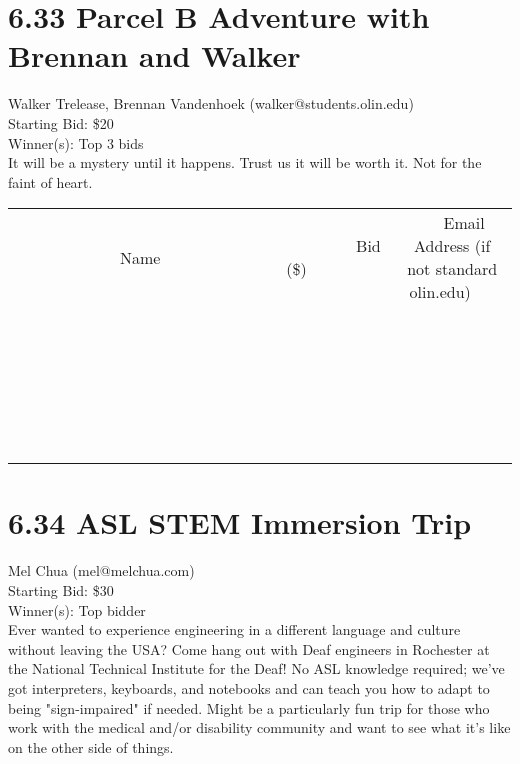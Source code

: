 \documentclass[11pt]{article}
\begin{document}
\section*{6.33 Parcel B Adventure with Brennan and Walker}
Walker Trelease, Brennan Vandenhoek (walker@students.olin.edu) \\
Starting Bid: \$20 \\
Winner(s): 
Top 3 bids \\
It will be a mystery until it happens. Trust us it will be worth it. Not for the faint of heart. \\[6ex]
\begin{tabular}{c c c}
~~~~~~~~~~~~~Name~~~~~~~~~~~~~ & ~~~~~~~~~Bid (\$)~~~~~~~~~ & ~~~Email Address (if not standard olin.edu)~~~ \\
 & & \\
\hline
 & & \\
\hline
 & & \\
\hline
 & & \\
\hline
 & & \\
\hline
 & & \\
\hline
 & & \\
\hline
 & & \\
\hline
 & & \\
\hline
 & & \\
\hline
 & & \\
\hline
 & & \\
\hline
 & & \\
\hline
 & & \\
\hline
 & & \\
\hline
 & & \\
\hline
 & & \\
\hline
 & & \\
\hline
 & & \\
\hline
 & & \\
\hline
 & & \\
\hline
 & & \\
\hline
 & & \\
\hline
 & & \\
\hline
 & & \\
\hline
 & & \\
\hline
\end{tabular}
\clearpage
\section*{6.34 ASL STEM Immersion Trip}
Mel Chua (mel@melchua.com) \\
Starting Bid: \$30 \\
Winner(s): 
Top bidder \\
Ever wanted to experience engineering in a different language and culture without leaving the USA? Come hang out with Deaf engineers in Rochester at the National Technical Institute for the Deaf! No ASL knowledge required; we've got interpreters, keyboards, and notebooks and can teach you how to adapt to being "sign-impaired" if needed. Might be a particularly fun trip for those who work with the medical and/or disability community and want to see what it's like on the other side of things.
\end{document}
